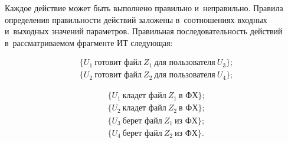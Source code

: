 \begin{multicols}{2}
  \vspace*{-2pt}
  
  Каждое действие может быть выполнено правильно и~неправильно. Правила 
определения правильности действий заложены в~соотношениях входных 
и~выходных значений параметров. Правильная последовательность действий 
в~рассматриваемом фрагменте ИТ сле\-ду\-ющая: 

\noindent
  \begin{align*}
  &\{U_1\ \mbox{готовит\ файл}\  Z_1\ \mbox{для\ пользователя}\ U_3\};\\
    &\{U_2\ \mbox{готовит\ файл}\ Z_2\ \mbox{для\ пользователя}\ U_4\};
    \end{align*}
    
    \noindent
      \begin{align*}
  &\{U_1\ \mbox{кладет\ файл}\ Z_1\  \mbox{в~ФХ}\};\\
  &\{U_2\ \mbox{кладет\ файл}\ Z_2\ \mbox{в~ФХ}\};\\
  &\{U_3\ \mbox{берет\ файл}\ Z_1\ \mbox{из~ФХ}\};\\
  &\{U_4\ \mbox{берет\ файл}\ Z_2\ \mbox{из~ФХ}\}.
  \end{align*}
  

\end{multicols}
